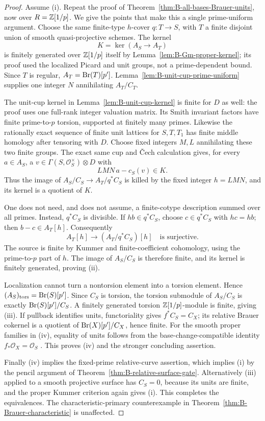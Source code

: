 \begin{proof}
Assume (i).  Repeat the proof of
Theorem~\ref{thm:B-all-bases-Brauer-units}, now over
\(R=\mathbb Z[1/p]\).  We give the points that make this a single
prime-uniform argument.  Choose the same finite-type
\(h\)-cover \(q:T\to S\), with \(T\) a finite disjoint
union of smooth quasi-projective schemes.  The kernel
\[
 K=\ker(A_S\to A_T)
\]
is finitely generated over \(\mathbb Z[1/p]\) itself by
Lemma~\ref{lem:B-Gm-proper-kernel}; its proof used the
localized Picard and unit groups, not a prime-dependent bound.
Since \(T\) is regular, \(A_T=\operatorname{Br}(T)[p']\).
Lemma~\ref{lem:B-unit-cup-prime-uniform} supplies one integer
\(N\) annihilating \(A_T/C_T\).

The unit-cup kernel in Lemma~\ref{lem:B-unit-cup-kernel}
is finite for \(D\) as well: the proof uses one full-rank
integer valuation matrix.  Its Smith invariant factors have
finite prime-to-\(p\) torsion, supported at finitely many
primes.  Likewise the rationally exact sequence of finite unit
lattices for \(S,T,T_1\) has finite middle homology after
tensoring with \(D\).  Choose fixed integers \(M,L\)
annihilating these two finite groups.  The exact same cup and
\v Cech calculation gives, for every \(a\in A_S\), a
\(v\in\Gamma(S,\mathcal O_S^\times)\otimes D\) with
\[
                      LMN\,a-c_S(v)\in K.
\]
Thus the image of \(A_S/C_S\to A_T/q^*C_S\) is killed
by the fixed integer \(h=LMN\), and its kernel is a quotient
of \(K\).

One does not need, and does not assume, a finite-cotype
description summed over all primes.  Instead, \(q^*C_S\)
is divisible.  If \(hb\in q^*C_S\), choose
\(c\in q^*C_S\) with \(hc=hb\); then \(b-c\in A_T[h]\).
Consequently
\[
              A_T[h]\longrightarrow(A_T/q^*C_S)[h]
              \quad\text{is surjective}.
\]
The source is finite by Kummer and finite-coefficient cohomology,
using the prime-to-\(p\) part of \(h\).
The image of \(A_S/C_S\) is therefore finite, and its kernel
is finitely generated, proving (ii).

Localization cannot turn a nontorsion element into a torsion
element.  Hence \((A_S)_{\rm tors}=\operatorname{Br}(S)[p']\).
Since \(C_S\) is torsion, the torsion submodule of \(A_S/C_S\)
is exactly \(\operatorname{Br}(S)[p']/C_S\).  A finitely generated torsion
\(\mathbb Z[1/p]\)-module is finite, giving (iii).
If pullback identifies units, functoriality gives
\(f^*C_S=C_X\); its relative Brauer cokernel is a quotient
of \(\operatorname{Br}(X)[p']/C_X\), hence finite.  For the smooth proper
families in (iv), equality of units follows from the
base-change-compatible identity \(f_*\mathcal O_X=\mathcal O_S\)
\cite[Lemma~36.32.6, tag 0E0L]{BStacksConnectedUnits}.
This proves (iv) and the stronger concluding assertion.

Finally (iv) implies the fixed-prime relative-curve assertion,
which implies (i) by the pencil argument of
Theorem~\ref{thm:B-relative-surface-gate}.
Alternatively (iii) applied to a smooth projective surface has
\(C_S=0\), because its units are finite, and the proper
Kummer criterion again gives (i).  This completes the
equivalences.  The characteristic-primary counterexample in
Theorem~\ref{thm:B-Brauer-characteristic} is unaffected.
\end{proof}

